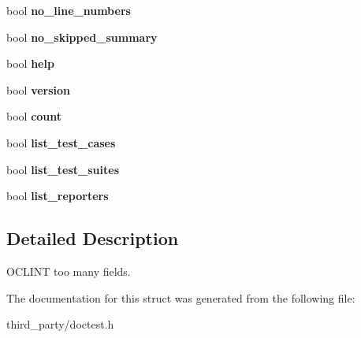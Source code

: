\begin{DoxyCompactItemize}
bool {\bfseries no\+\_\+line\+\_\+numbers}
\item 
\mbox{\label{structdoctest_1_1_context_options_a4e22eec59e63ed4ff6ab4dfce2389c99}} 
bool {\bfseries no\+\_\+skipped\+\_\+summary}
\item 
\mbox{\label{structdoctest_1_1_context_options_a9d542a95ee03f61c233fff51e7461400}} 
bool {\bfseries help}
\item 
\mbox{\label{structdoctest_1_1_context_options_a08931527a9e5e634e64a336e5493a7c1}} 
bool {\bfseries version}
\item 
\mbox{\label{structdoctest_1_1_context_options_a4651b5efbaf2ffc03d60fb4140d21dd3}} 
bool {\bfseries count}
\item 
\mbox{\label{structdoctest_1_1_context_options_a813e1543c358ab8a7a432b4ad2b32e56}} 
bool {\bfseries list\+\_\+test\+\_\+cases}
\item 
\mbox{\label{structdoctest_1_1_context_options_a579399a66b278cbf96b6183d337f486b}} 
bool {\bfseries list\+\_\+test\+\_\+suites}
\item 
\mbox{\label{structdoctest_1_1_context_options_ad3daf077ac3182db5175f8baff49fce0}} 
bool {\bfseries list\+\_\+reporters}
\end{DoxyCompactItemize}


\subsection{Detailed Description}
O\+C\+L\+I\+NT too many fields. 

The documentation for this struct was generated from the following file\+:\begin{DoxyCompactItemize}
\item 
third\+\_\+party/doctest.\+h\end{DoxyCompactItemize}
